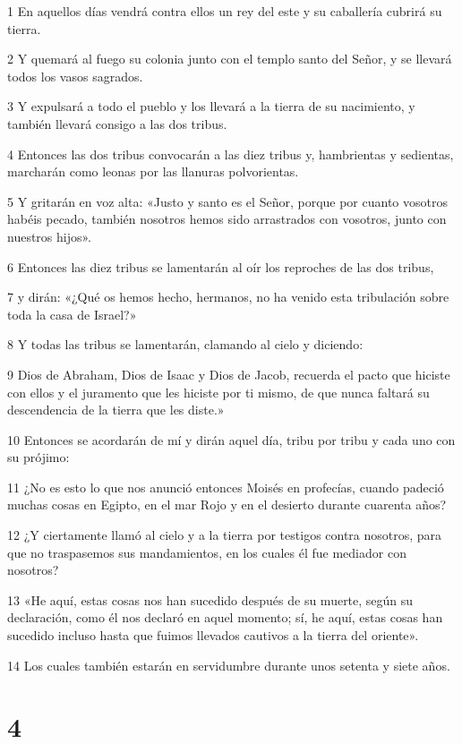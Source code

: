 \par 1 En aquellos días vendrá contra ellos un rey del este y su caballería cubrirá su tierra.
\par 2 Y quemará al fuego su colonia junto con el templo santo del Señor, y se llevará todos los vasos sagrados.
\par 3 Y expulsará a todo el pueblo y los llevará a la tierra de su nacimiento, y también llevará consigo a las dos tribus.
\par 4 Entonces las dos tribus convocarán a las diez tribus y, hambrientas y sedientas, marcharán como leonas por las llanuras polvorientas.
\par 5 Y gritarán en voz alta: «Justo y santo es el Señor, porque por cuanto vosotros habéis pecado, también nosotros hemos sido arrastrados con vosotros, junto con nuestros hijos».
\par 6 Entonces las diez tribus se lamentarán al oír los reproches de las dos tribus,
\par 7 y dirán: «¿Qué os hemos hecho, hermanos, no ha venido esta tribulación sobre toda la casa de Israel?»
\par 8 Y todas las tribus se lamentarán, clamando al cielo y diciendo:
\par 9 Dios de Abraham, Dios de Isaac y Dios de Jacob, recuerda el pacto que hiciste con ellos y el juramento que les hiciste por ti mismo, de que nunca faltará su descendencia de la tierra que les diste.»
\par 10 Entonces se acordarán de mí y dirán aquel día, tribu por tribu y cada uno con su prójimo:
\par 11 ¿No es esto lo que nos anunció entonces Moisés en profecías, cuando padeció muchas cosas en Egipto, en el mar Rojo y en el desierto durante cuarenta años?
\par 12 ¿Y ciertamente llamó al cielo y a la tierra por testigos contra nosotros, para que no traspasemos sus mandamientos, en los cuales él fue mediador con nosotros?
\par 13 «He aquí, estas cosas nos han sucedido después de su muerte, según su declaración, como él nos declaró en aquel momento; sí, he aquí, estas cosas han sucedido incluso hasta que fuimos llevados cautivos a la tierra del oriente».
\par 14 Los cuales también estarán en servidumbre durante unos setenta y siete años.

\chapter{4}

